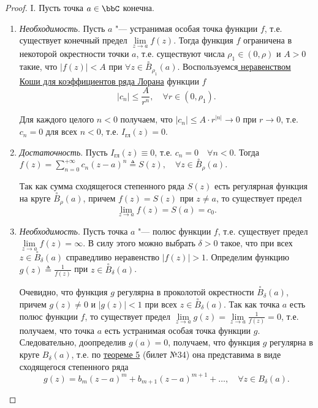 \begin{proof}

I. Пусть точка $a \in \bbC$ конечна.

\begin{enumerate}

\item \textit{Необходимость}. Пусть $a$ "--- устранимая особая точка функции $f$, т.е. существует конечный предел $\lim\limits_{z \to a} f(z)$. Тогда функция $f$ ограничена в некоторой окрестности точки $a$, т.е. существуют числа $\rho_1 \in (0, \rho)$ и $A > 0$ такие, что $|f(z)| < A$ при $\forall z \in \overset{\circ}{B}_{\rho_1}(a)$. Воспользуемся\hyperref[ch35.1cons3]{ неравенством Коши для коэффициентов ряда Лорана} функции $f$
$$
|c_n| \le \frac{A}{r^n}, \quad \forall r \in (0, \rho_1).
$$

Для каждого целого $n < 0$ получаем, что $|c_n| \le A \cdot r^{|n|} \to 0$ при $r \to 0$, т.е. $c_n = 0$ для всех $n < 0$, т.е. $I_{\text{гл}}(z) = 0$.

\item \textit{Достаточность}. Пусть $I_{\text{гл}}(z) \equiv 0$, т.е. $c_n = 0 \quad \forall n < 0$. Тогда $f(z) = \sum\limits_{n = 0}^{+\infty} c_n (z - a)^n \triangleq S(z), \quad \forall z \in \overset{\circ}{B}_{\rho}(a)$.

Так как сумма сходящегося степенного ряда $S(z)$ есть регулярная функция на круге $\overset{\circ}{B}_{\rho}(a)$, причем $f(z) = S(z)$ при $z \not= a$, то существует предел
$$
\lim_{z \to a} f(z) = S(a) = c_0.
$$

\item \textit{Необходимость}. Пусть точка $a$ "--- полюс функции $f$, т.е. существует предел $\lim\limits_{z \to a} f(z) = \infty$. В силу этого можно выбрать $\delta > 0$ такое, что при всех $z \in \overset{\circ}{B}_{\delta}(a)$ справедливо неравенство $|f(z)| > 1$. Определим функцию $g(z)\triangleq\frac{1}{f(z)}$ при $z \in \overset{\circ}{B}_{\delta}(a)$.

Очевидно, что функция $g$ регулярна в проколотой окрестности $\overset{\circ}{B}_{\delta}(a)$, причем $g(z) \not= 0$ и $|g(z)| < 1$ при всех $z \in \overset{\circ}{B}_{\delta}(a)$. Так как точка $a$ есть полюс функции $f$, то существует предел $\lim\limits_{z \to a} g(z) = \lim\limits_{z \to a} \frac{1}{f(z)} = 0$, т.е. получаем, что точка $a$ есть устранимая особая точка функции $g$. Следовательно, доопределив $g(a) = 0$, получаем, что функция $g$ регулярна в круге $B_{\delta}(a)$, т.е. по \hyperref[abc29]{теореме 5} (билет №34) она представима в виде сходящегося степенного ряда
\begin{equation} \label{ch35.2eq3}
g(z) = b_m (z - a)^m + b_{m + 1} (z - a)^{m + 1} + \ldots, \quad \forall z \in B_\delta(a).
\end{equation}


\end{enumerate}
\end{proof}
